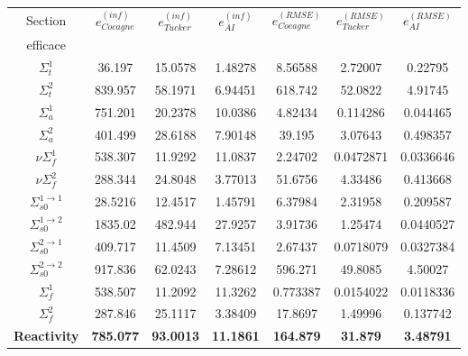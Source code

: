 \begin{center}
\begin{table}[!h]
\begin{tabular}{|c||c|c|c||c|c|c|}
		\hline
		Section 													& $e_{Cocagne}^{(inf)}$			& $e_{Tucker}^{(inf)}$			&	$e_{AI}^{(inf)}$			&	$e_{Cocagne}^{(RMSE)}$			& $e_{Tucker}^{(RMSE)}$			&	$e_{AI}^{(RMSE)}$			\\
		efficace													&	&	&	&	&	&	\\
		\hline
		$\Sigma_t^1$											&	36.197&	15.0578&	1.48278&	8.56588&	2.72007&	0.22795 \\
		\hline
		$\Sigma_t^2$											&	839.957&	58.1971&	6.94451&	618.742&	52.0822&	4.91745 \\
		\hline
		$\Sigma_a^1$											& 751.201&	20.2378&	10.0386&	4.82434&	0.114286&	0.044465 \\
		\hline
		$\Sigma_a^2$											& 401.499&	28.6188&	7.90148&	39.195&	3.07643&	0.498357 \\
		\hline
		$\nu\Sigma_f^1$										& 538.307&	11.9292&	11.0837&	2.24702&	0.0472871&	0.0336646 \\
		\hline
		$\nu\Sigma_f^2$										& 288.344&	24.8048&	3.77013&	51.6756&	4.33486&	0.413668 \\
		\hline
		$\Sigma_{s0}^{1\rightarrow1}$			& 28.5216&	12.4517&	1.45791&	6.37984&	2.31958&	0.209587 \\
		\hline
		$\Sigma_{s0}^{1\rightarrow2}$			& 1835.02&	482.944&	27.9257&	3.91736&	1.25474&	0.0440527 \\
		\hline
		$\Sigma_{s0}^{2\rightarrow1}$			& 409.717&	11.4509&	7.13451&	2.67437&	0.0718079&	0.0327384 \\
		\hline
		$\Sigma_{s0}^{2\rightarrow2}$			& 917.836&	62.0243&	7.28612&	596.271&	49.8085&	4.50027 \\
		\hline
		$\Sigma_f^1$											& 538.507&	11.2092&	11.3262&	0.773387&	0.0154022&	0.0118336 \\
		\hline
		$\Sigma_f^2$											& 287.846&	25.1117&	3.38409&	17.8697&	1.49996&	0.137742 \\
		\hline
		\textbf{Reactivity}								& \textbf{785.077}&	\textbf{93.0013}&	\textbf{11.1861}&	\textbf{164.879}&	\textbf{31.879}&	\textbf{3.48791} \\
		\hline
\end{tabular}
\label{table:precision}
\end{table}
\end{center}

